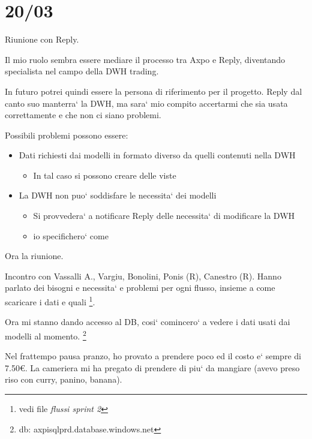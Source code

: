 \section{20/03}
    Riunione con Reply.
    
    Il mio ruolo sembra essere mediare il processo tra Axpo e Reply, diventando specialista nel campo della DWH trading.
    
    In futuro potrei quindi essere la persona di riferimento per il progetto.
    Reply dal canto suo manterra` la DWH, ma sara` mio compito accertarmi che sia usata correttamente e che non ci siano problemi.
    
    Possibili problemi possono essere:
    \begin{itemize}
        \item Dati richiesti dai modelli in formato diverso da quelli contenuti nella DWH
        \begin{itemize}
            \item In tal caso si possono creare delle viste
        \end{itemize}
        
        \item La DWH non puo` soddisfare le necessita` dei modelli
        \begin{itemize}
            \item Si provvedera` a notificare Reply delle necessita` di modificare la DWH
            
            \item io specifichero` come
        \end{itemize}
    \end{itemize}
    
    Ora la riunione.
    
    Incontro con Vassalli A., Vargiu, Bonolini, Ponis (R), Canestro (R).
    Hanno parlato dei bisogni e necessita` e problemi per ogni flusso, insieme a come scaricare i dati e quali \footnote{vedi file \textit{flussi sprint 2}}.
    
    Ora mi stanno dando accesso al DB, cosi` comincero` a vedere i dati usati dai modelli al momento. \footnote{db: axpisqlprd.database.windows.net}
    
    Nel frattempo pausa pranzo, ho provato a prendere poco ed il costo e` sempre di 7.50\euro{}. La cameriera mi ha pregato di prendere di piu` da mangiare (avevo preso riso con curry, panino, banana).